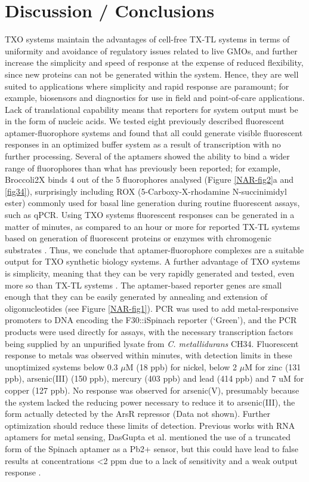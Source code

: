 \section{Discussion / Conclusions}
TXO systems maintain the advantages of cell-free TX-TL systems in terms of uniformity and avoidance of regulatory issues related to live GMOs, and further increase the simplicity and speed of response at the expense of reduced flexibility, since new proteins can not be generated within the system. Hence, they are well suited to applications where simplicity and rapid response are paramount; for example, biosensors and diagnostics for use in field and point-of-care applications. Lack of translational capability means that reporters for system output must be in the form of nucleic acids. We tested eight previously described fluorescent aptamer-fluorophore systems and found that all could generate visible fluorescent responses in an optimized buffer system as a result of transcription with no further processing. Several of the aptamers showed the ability to bind a wider range of fluorophores than what has previously been reported; for example, Broccoli2X binds 4 out of the 5 fluorophores analysed (Figure \ref{NAR-fig2}a and \ref{fig34}), surprisingly including ROX (5-Carboxy-X-rhodamine N-succinimidyl ester) commonly used for basal line generation during routine fluorescent assays, such as qPCR. Using TXO systems fluorescent responses can be generated in a matter of minutes, as compared to an hour or more for reported TX-TL systems based on generation of fluorescent proteins or enzymes with chromogenic substrates \citep{borkowski2016overloaded,bernhard2013cell,carlson2012cell,kwon2015high,salehi2017cell,salehi2018biosensing}. Thus, we conclude that aptamer-fluorophore complexes are a suitable output for TXO synthetic biology systems.
A further advantage of TXO systems is simplicity, meaning that they can be very rapidly generated and tested, even more so than TX-TL systems \citep{pardee2016rapid}. The aptamer-based reporter genes are small enough that they can be easily generated by annealing and extension of oligonucleotides (see Figure \ref{NAR-fig1}). PCR was used to add metal-responsive promoters to DNA encoding the F30::iSpinach reporter (‘Green’), and the PCR products were used directly for assays, with the necessary transcription factors being supplied by an unpurified lysate from \textit{C. metallidurans} CH34. Fluorescent response to metals was observed within minutes, with detection limits in these unoptimized systems below 0.3 $\mu$M (18 ppb) for nickel, below 2 $\mu$M for zinc (131 ppb), arsenic(III) (150 ppb), mercury (403 ppb) and lead (414 ppb) and 7 uM for copper (127 ppb). No response was observed for arsenic(V), presumably because the system lacked the reducing power necessary to reduce it to arsenic(III), the form actually detected by the ArsR repressor (Data not shown). Further optimization should reduce these limits of detection. Previous works with RNA aptamers for metal sensing, DasGupta et al. mentioned the use of a truncated form of the Spinach aptamer as a Pb2+ sensor, but this could have lead to false results at concentrations <2 ppm due to a lack of sensitivity and a weak output response \citep{alam2017fluorescent}.
